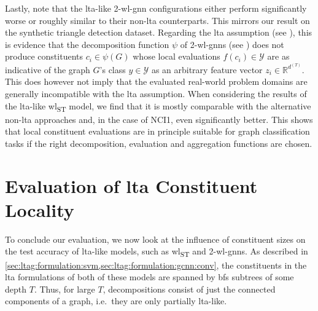 Lastly, note that the \acs{lta}-like 2-\acs{wl}-\acs{gnn} configurations either perform significantly worse or roughly similar to their non-\acs{lta} counterparts.
This mirrors our result on the synthetic triangle detection dataset.
Regarding the \acs{lta} assumption (see ), this is evidence that the decomposition function $\psi$ of 2-\acs{wl}-\acsp{gnn} (see ) does not produce constituents $c_i \in \psi(G)$ whose local evaluations $f(c_i) \in \mathcal{Y}$ are as indicative of the graph $G$'s class $y \in \mathcal{Y}$ as an arbitrary feature vector $z_i \in \mathbb{R}^{d^{(T)}}$.
This does however not imply that the evaluated real-world problem domains are generally incompatible with the \ac{lta} assumption.
When considering the results of the \ac{lta}-like \acs{wl}\textsubscript{ST} model, we find that it is mostly comparable with the alternative non-\acs{lta} approaches and, in the case of NCI1, even significantly better.
This shows that local constituent evaluations are in principle suitable for graph classification tasks if the right decomposition, evaluation and aggregation functions are chosen.

\section{Evaluation of \acs*{lta} Constituent Locality}%
\label{sec:eval:lta}

To conclude our evaluation, we now look at the influence of constituent sizes on the test accuracy of \acs{lta}-like models, such as \acs{wl}\textsubscript{ST} and 2-\acs{wl}-\acsp{gnn}.
As described in \cref{sec:ltag:formulation:svm,sec:ltag:formulation:gcnn:conv}, the constituents in the \ac{lta} formulations of both of these models are spanned by \ac{bfs} subtrees of some depth $T$.
Thus, for large $T$, decompositions consist of just the connected components of a graph, i.e.\ they are only partially \acs{lta}-like.

